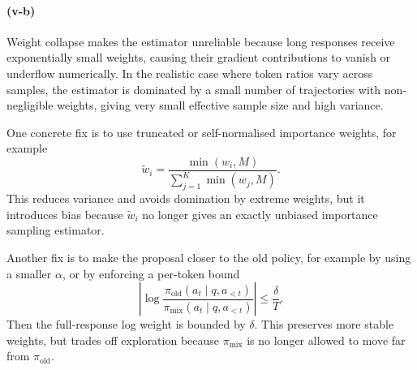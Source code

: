 \paragraph{(v-b)}
Weight collapse makes the estimator unreliable because long responses receive
exponentially small weights, causing their gradient contributions to vanish or
underflow numerically. In the realistic case where token ratios vary across
samples, the estimator is dominated by a small number of trajectories with
non-negligible weights, giving very small effective sample size and high
variance.

One concrete fix is to use truncated or self-normalised importance weights, for
example
\[
\tilde w_i
=
\frac{\min(w_i,M)}
{\sum_{j=1}^K \min(w_j,M)}.
\]
This reduces variance and avoids domination by extreme weights, but it introduces
bias because \(\tilde w_i\) no longer gives an exactly unbiased importance
sampling estimator.

Another fix is to make the proposal closer to the old policy, for example by
using a smaller \(\alpha\), or by enforcing a per-token bound
\[
\left|
\log
\frac{\pi_{\mathrm{old}}(a_t\mid q,a_{<t})}
{\pi_{\mathrm{mix}}(a_t\mid q,a_{<t})}
\right|
\leq
\frac{\delta}{T}.
\]
Then the full-response log weight is bounded by \(\delta\). This preserves more
stable weights, but trades off exploration because \(\pi_{\mathrm{mix}}\) is no
longer allowed to move far from \(\pi_{\mathrm{old}}\).